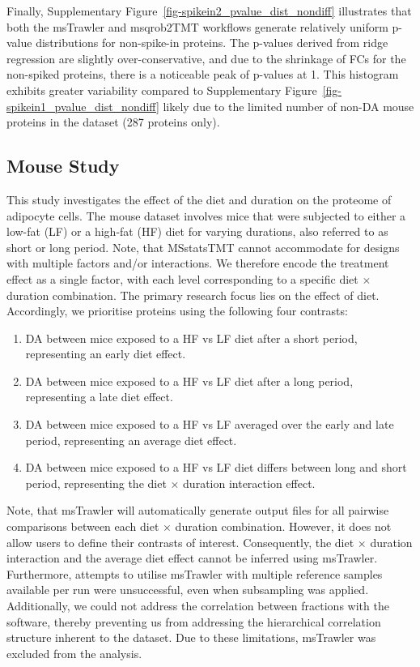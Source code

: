 \documentclass[
  letterpaper,
  DIV=11,
  numbers=noendperiod]{scrartcl}
\providecommand{\tightlist}{%
  \setlength{\itemsep}{0pt}\setlength{\parskip}{0pt}}\usepackage{longtable,booktabs,array}
\begin{document}
Finally, Supplementary Figure~\ref{fig-spikein2_pvalue_dist_nondiff}
illustrates that both the msTrawler and msqrob2TMT workflows generate
relatively uniform p-value distributions for non-spike-in proteins. The
p-values derived from ridge regression are slightly over-conservative,
and due to the shrinkage of FCs for the non-spiked proteins, there is a
noticeable peak of p-values at 1. This histogram exhibits greater
variability compared to Supplementary
Figure~\ref{fig-spikein1_pvalue_dist_nondiff} likely due to the limited
number of non-DA mouse proteins in the dataset (287 proteins only).

\subsection{Mouse Study}

This study investigates the effect of the diet and duration on the
proteome of adipocyte cells. The mouse dataset involves mice that were
subjected to either a low-fat (LF) or a high-fat (HF) diet for varying
durations, also referred to as short or long period. Note, that
MSstatsTMT cannot accommodate for designs with multiple factors and/or
interactions. We therefore encode the treatment effect as a single
factor, with each level corresponding to a specific diet \(\times\)
duration combination. The primary research focus lies on the effect of
diet. Accordingly, we prioritise proteins using the following four
contrasts:

\begin{enumerate}
\def\labelenumi{\arabic{enumi}.}
\tightlist
\item
  DA between mice exposed to a HF vs LF diet after a short period,
  representing an early diet effect.
\item
  DA between mice exposed to a HF vs LF diet after a long period,
  representing a late diet effect.
\item
  DA between mice exposed to a HF vs LF averaged over the early and late
  period, representing an average diet effect.
\item
  DA between mice exposed to a HF vs LF diet differs between long and
  short period, representing the diet \(\times\) duration interaction
  effect.
\end{enumerate}

Note, that msTrawler will automatically generate output files for all
pairwise comparisons between each diet \(\times\) duration combination.
However, it does not allow users to define their contrasts of interest.
Consequently, the diet \(\times\) duration interaction and the average
diet effect cannot be inferred using msTrawler. Furthermore, attempts to
utilise msTrawler with multiple reference samples available per run were
unsuccessful, even when subsampling was applied. Additionally, we could
not address the correlation between fractions with the software, thereby
preventing us from addressing the hierarchical correlation structure
inherent to the dataset. Due to these limitations, msTrawler was
excluded from the analysis.
\end{document}
